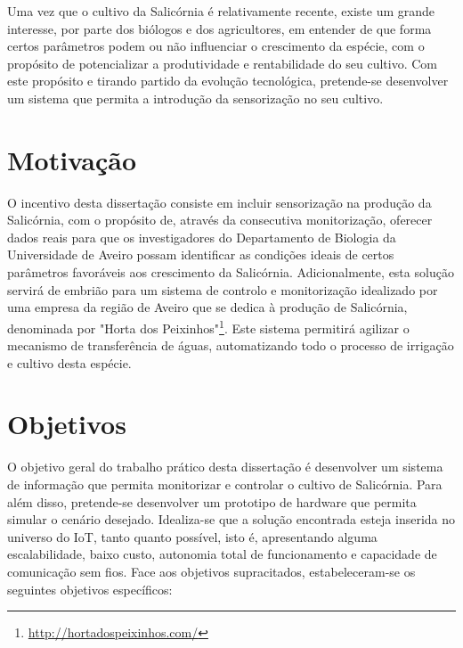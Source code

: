 Uma vez que o cultivo da Salicórnia é relativamente recente, existe um grande interesse, por parte dos biólogos e dos agricultores, em entender de que forma certos parâmetros podem ou não influenciar o crescimento da espécie, com o propósito de potencializar a produtividade e rentabilidade do seu cultivo. Com este propósito e tirando partido da evolução tecnológica, pretende-se desenvolver um sistema que permita a introdução da sensorização no seu cultivo.     


\section{Motivação}

O incentivo desta dissertação consiste em incluir sensorização na produção da Salicórnia, com o propósito de, através da consecutiva monitorização, oferecer dados reais para que os investigadores do Departamento de Biologia da Universidade de Aveiro possam identificar as condições ideais de certos parâmetros favoráveis aos crescimento da Salicórnia. Adicionalmente, esta solução servirá de embrião para um sistema de controlo e monitorização idealizado por uma empresa da região de Aveiro que se dedica à produção de Salicórnia, denominada por "Horta dos Peixinhos"\footnote{\url{http://hortadospeixinhos.com/}}. Este sistema permitirá agilizar o mecanismo de transferência de águas, automatizando todo o processo de irrigação e cultivo desta espécie. 









\section{Objetivos}
\label{objectivos}



O objetivo geral do trabalho prático desta dissertação é desenvolver um sistema de informação que permita monitorizar e controlar o cultivo de Salicórnia. Para além disso, pretende-se desenvolver um prototipo de hardware que permita  simular o cenário desejado. Idealiza-se que a solução encontrada esteja inserida no universo do \ac{IoT}, tanto quanto possível, isto é, apresentando alguma escalabilidade, baixo custo, autonomia total de funcionamento e capacidade de comunicação sem fios. Face aos objetivos supracitados, estabeleceram-se os seguintes objetivos específicos:




